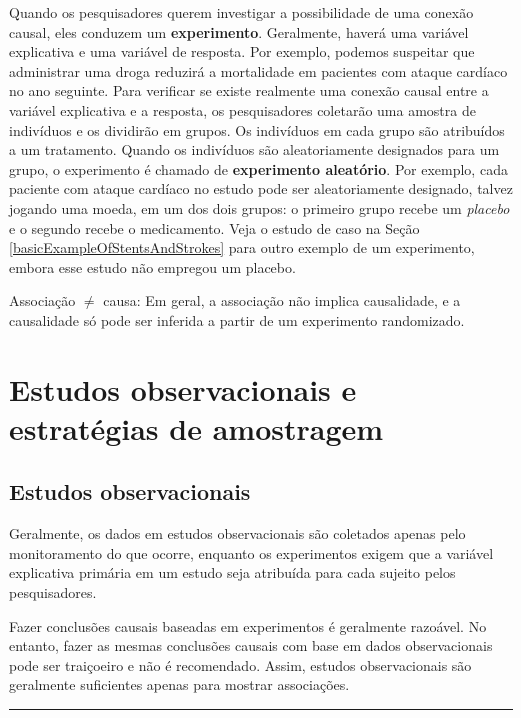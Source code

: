 \documentclass[
]{book}
\theoremstyle{definition}
\theoremstyle{definition}
\theoremstyle{definition}
\theoremstyle{definition}
\theoremstyle{remark}
\begin{document}
Quando os pesquisadores querem investigar a possibilidade de uma conexão causal, eles conduzem um \textbf{experimento}. Geralmente, haverá uma variável explicativa e uma variável de resposta. Por exemplo, podemos suspeitar que administrar uma droga reduzirá a mortalidade em pacientes com ataque cardíaco no ano seguinte. Para verificar se existe realmente uma conexão causal entre a variável explicativa e a resposta, os pesquisadores coletarão uma amostra de indivíduos e os dividirão em grupos. Os indivíduos em cada grupo são atribuídos a um tratamento. Quando os indivíduos são aleatoriamente designados para um grupo, o experimento é chamado de \textbf{experimento aleatório}. Por exemplo, cada paciente com ataque cardíaco no estudo pode ser aleatoriamente designado, talvez jogando uma moeda, em um dos dois grupos: o primeiro grupo recebe um \emph{placebo} e o segundo recebe o medicamento. Veja o estudo de caso na Seção \ref{basicExampleOfStentsAndStrokes} para outro exemplo de um experimento, embora esse estudo não empregou um placebo.

Associação \(\neq\) causa: Em geral, a associação não implica causalidade, e a causalidade só pode ser inferida a partir de um experimento randomizado.

\hypertarget{observationalStudiesSamplingStrategies}{%
\section{Estudos observacionais e estratégias de amostragem}\label{observationalStudiesSamplingStrategies}}

\hypertarget{observationalStudies}{%
\subsection{Estudos observacionais}\label{observationalStudies}}

Geralmente, os dados em estudos observacionais são coletados apenas pelo monitoramento do que ocorre, enquanto os experimentos exigem que a variável explicativa primária em um estudo seja atribuída para cada sujeito pelos pesquisadores.

Fazer conclusões causais baseadas em experimentos é geralmente razoável. No entanto, fazer as mesmas conclusões causais com base em dados observacionais pode ser traiçoeiro e não é recomendado. Assim, estudos observacionais são geralmente suficientes apenas para mostrar associações.

\begin{center}\rule{0.5\linewidth}{0.5pt}\end{center}
\end{document}
